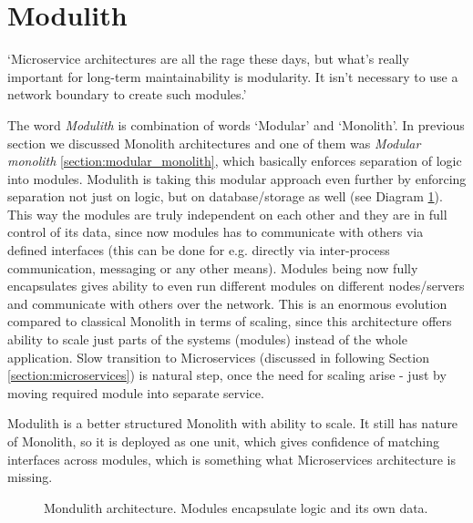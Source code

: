 \section{Modulith}
\label{section:modulith}
`Microservice architectures are all the rage these days, but what's really important for long-term maintainability is modularity. It isn't necessary to use a network boundary to create such modules.' \cite{HOW_TO_BUILD_MODULAR_MONOLITH_CONFERENCE_INTRO}

The word \textit{Modulith} is combination of words `Modular' and `Monolith'. In previous section we discussed Monolith architectures and one of them was \textit{Modular monolith} \ref{section:modular_monolith}, which basically enforces separation of logic into modules. Modulith is taking this modular approach even further by enforcing separation not just on logic, but on database/storage as well (see Diagram \ref{img:modulith_architecture}). This way the modules are truly independent on each other and they are in full control of its data, since now modules has to communicate with others via defined interfaces (this can be done for e.g. directly via inter-process communication, messaging or any other means). Modules being now fully encapsulates gives ability to even run different modules on different nodes/servers and communicate with others over the network. This is an enormous evolution compared to classical Monolith in terms of scaling, since this architecture offers ability to scale just parts of the systems (modules) instead of the whole application. Slow transition to Microservices (discussed in following Section \ref{section:microservices}) is natural step, once the need for scaling arise - just by moving required module into separate service.

Modulith is a better structured Monolith with ability to scale. It still has nature of Monolith, so it is deployed as one unit, which gives confidence of matching interfaces across modules, which is something what Microservices architecture is missing.

\begin{figure}
    \centering
    
    \caption{Mondulith architecture. Modules encapsulate logic and its own data. \label{img:modulith_architecture}}
\end{figure}
